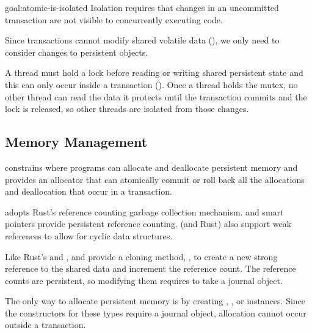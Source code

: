 \begin{goaltrue}{goal:atomic-is-isolated}
  Isolation requires that changes in an uncommitted transaction are not visible
  to concurrently executing code.

  Since transactions cannot modify shared volatile data
  (), we only need to consider changes to
  persistent objects.

  A thread must hold a lock before reading or writing shared persistent state
  and this can only occur inside a transaction
  ().  Once a thread holds the mutex, no other
  thread can read the data it protects until the transaction commits and the lock is released, so other threads are isolated from
  those changes.
\end{goaltrue}

\subsection{Memory Management}

\This{} constrains where programs can allocate and deallocate persistent memory
and provides an allocator that can atomically commit or roll back all the
allocations and deallocation that occur in a transaction.

\This{} adopts Rust's reference counting garbage collection mechanism.
 and  smart pointers provide
 persistent reference counting.  \This{} (and Rust)
also support weak references to allow for cyclic data structures.

Like Rust's  and ,   and  provide
a cloning method, , to create a new strong reference to the shared
data and increment the reference count.  The reference counts are persistent, so
modifying them requires  to take a journal object.

 The only way to allocate persistent memory is by
creating , , or  instances.  Since the
constructors for these types require a journal object, allocation cannot
occur outside a transaction.



